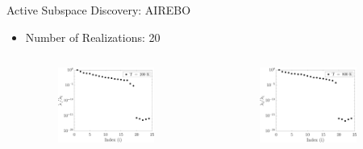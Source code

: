 \documentclass[handout,xcolor={x11names,table},compress,svgnames,mathserif]{beamer}
\renewcommand{\(}{\begin{columns}}
\renewcommand{\)}{\end{columns}}
\newcommand{\<}[1]{\begin{column}{#1}}
\renewcommand{\>}{\end{column}}
\newcommand*\myitem{%
  \item[\color{DeepSkyBlue4}\scalebox{0.6}{\ding{110}}]}
\begin{document}
\begin{frame}{Active Subspace Discovery: AIREBO}

\begin{itemize}
\myitem Number of Realizations: 20 \\ \vspace{3mm}

\begin{columns}
\begin{column}{0.5\textwidth}
%
\begin{figure}[htbp]
\begin{center}
\includegraphics[width=0.8\textwidth]{./Figures/eig_airebo_k200}
\end{center}
\end{figure}
%
\end{column}
\hspace{-20mm}
\begin{column}{0.5\textwidth}
%
\begin{figure}[htbp]
\begin{center}
\includegraphics[width=0.8\textwidth]{./Figures/eig_airebo_k800}
\end{center}
\end{figure}
%

\end{column}
\end{columns}

\end{itemize}

\end{frame}
\end{document}
